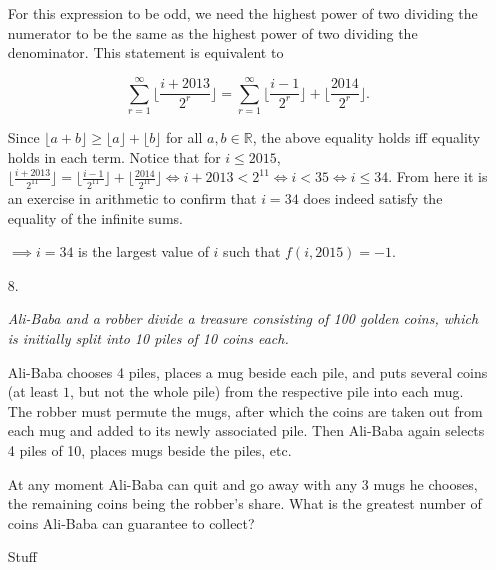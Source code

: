 \documentclass{article}
\begin{document}
\begin{enumerate}
For this expression to be odd, we need the highest power of two dividing the numerator to be the same as the highest power of two dividing the denominator. This statement is equivalent to

$$\sum_{r = 1}^{\infty} \lfloor{\frac{i + 2013}{2^r}}\rfloor = \sum_{r = 1}^{\infty}\lfloor \frac{i - 1}{2^r} \rfloor + \lfloor \frac{2014}{2^r} \rfloor.$$

Since $\lfloor a + b \rfloor \ge \lfloor a \rfloor + \lfloor b \rfloor$ for all $a, b \in \mathbb{R}$, the above equality holds iff equality holds in each term. Notice that for $i \le 2015$, $\lfloor \frac{i + 2013}{2^{11}} \rfloor = \lfloor \frac{i - 1}{2^{11}} \rfloor + \lfloor \frac{2014}{2^{11}} \rfloor \iff i + 2013 < 2^{11} \iff i < 35 \iff i \le 34$. From here it is an exercise in arithmetic to confirm that $i = 34$ does indeed satisfy the equality of the infinite sums.

$\implies i = 34$ is the largest value of $i$ such that $f(i, 2015) = -1$.

\medskip
\item[8.] %
{\itshape Ali-Baba and a robber divide a treasure consisting of 100 golden coins, which is initially split into 10 piles of 10 coins each.

Ali-Baba chooses 4 piles, places a mug beside each pile, and puts several coins (at least $1$, but not the whole pile) from the respective pile into each mug.
The robber must permute the mugs, after which the coins are taken out from each mug and added to its newly associated pile.
Then Ali-Baba again selects 4 piles of 10, places mugs beside the piles, etc.

At any moment Ali-Baba can quit and go away with any 3 mugs he chooses, the remaining coins being the robber's share.
What is the greatest number of coins Ali-Baba can guarantee to collect?}

Stuff


\end{enumerate}
\end{document}
